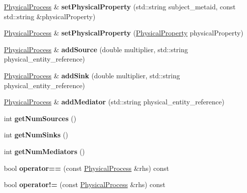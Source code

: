 \begin{DoxyCompactItemize}
\mbox{\label{classomexmeta_1_1PhysicalProcess_ac875058d67408246aa28cf58dd77ccf6}} 
\hyperlink{classomexmeta_1_1PhysicalProcess}{Physical\+Process} \& {\bfseries set\+Physical\+Property} (std\+::string subject\+\_\+metaid, const std\+::string \&physical\+Property)
\item 
\mbox{\label{classomexmeta_1_1PhysicalProcess_ac49bf4a1c21c6590a9d2af7ae93e13a7}} 
\hyperlink{classomexmeta_1_1PhysicalProcess}{Physical\+Process} \& {\bfseries set\+Physical\+Property} (\hyperlink{classomexmeta_1_1PhysicalProperty}{Physical\+Property} physical\+Property)
\item 
\mbox{\label{classomexmeta_1_1PhysicalProcess_ab42b6e17886e244f1f3c4611a5c4caef}} 
\hyperlink{classomexmeta_1_1PhysicalProcess}{Physical\+Process} \& {\bfseries add\+Source} (double multiplier, std\+::string physical\+\_\+entity\+\_\+reference)
\item 
\mbox{\label{classomexmeta_1_1PhysicalProcess_a0c41d7e4c7c750b8ab9705608ab69e74}} 
\hyperlink{classomexmeta_1_1PhysicalProcess}{Physical\+Process} \& {\bfseries add\+Sink} (double multiplier, std\+::string physical\+\_\+entity\+\_\+reference)
\item 
\mbox{\label{classomexmeta_1_1PhysicalProcess_a2bdf8dde5ffa6b38d5042db49fd211d1}} 
\hyperlink{classomexmeta_1_1PhysicalProcess}{Physical\+Process} \& {\bfseries add\+Mediator} (std\+::string physical\+\_\+entity\+\_\+reference)
\item 
\mbox{\label{classomexmeta_1_1PhysicalProcess_a56459d9f0087a3f92b0aca5d148b65f5}} 
int {\bfseries get\+Num\+Sources} ()
\item 
\mbox{\label{classomexmeta_1_1PhysicalProcess_ac8b79af15d4d19042ee34abca25f679f}} 
int {\bfseries get\+Num\+Sinks} ()
\item 
\mbox{\label{classomexmeta_1_1PhysicalProcess_a717a352ce3bb956201174002f904cd26}} 
int {\bfseries get\+Num\+Mediators} ()
\item 
\mbox{\label{classomexmeta_1_1PhysicalProcess_a65585bf5cd473d509f6f66c96757ff8d}} 
bool {\bfseries operator==} (const \hyperlink{classomexmeta_1_1PhysicalProcess}{Physical\+Process} \&rhs) const
\item 
\mbox{\label{classomexmeta_1_1PhysicalProcess_af8298394b713807ec51c2b5f60afd00e}} 
bool {\bfseries operator!=} (const \hyperlink{classomexmeta_1_1PhysicalProcess}{Physical\+Process} \&rhs) const
\end{DoxyCompactItemize}
